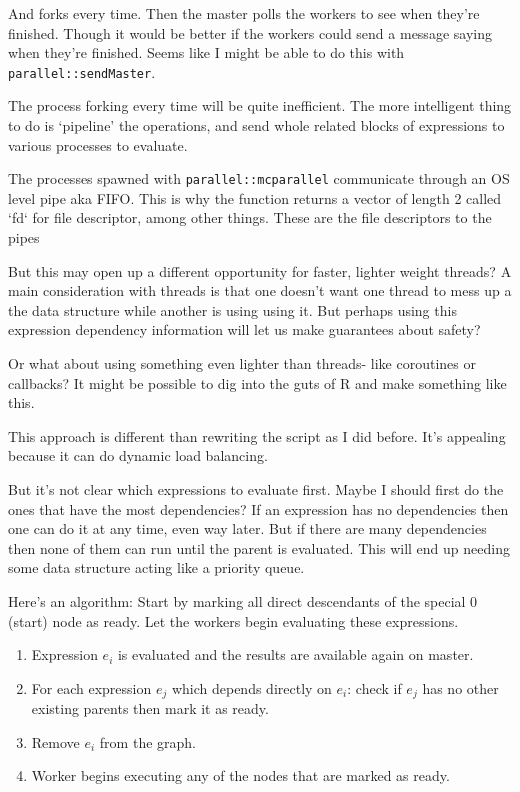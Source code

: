 \documentclass[12pt]{article}
\begin{document}
And forks every time. Then the master polls the workers to see
when they're finished. Though it would be better if the workers could send a
message saying when they're finished. Seems like I might be able to do this
with \texttt{parallel::sendMaster}.

The process forking every time will be quite inefficient. The more intelligent
thing to do is `pipeline' the operations, and send whole related blocks of
expressions to various processes to evaluate.

The processes spawned with \texttt{parallel::mcparallel} communicate
through an OS level pipe aka FIFO. This is why the function returns a vector of
length 2 called `fd` for file descriptor, among other things. These are the
file descriptors to the pipes

But this may open up a different opportunity for faster, lighter weight
threads? A main consideration with threads is that one doesn't want one
thread to mess up a the data structure while another is using using it. But
perhaps using this expression dependency information will let us make
guarantees about safety?

Or what about using something even lighter than threads- like coroutines or
callbacks? It might be possible to dig into the guts of R and make
something like this.

This approach is different than rewriting the script as I did before. It's appealing
because it can do dynamic load balancing.

But it's not clear which expressions to evaluate first. Maybe I should
first do the ones that have the most dependencies? If an expression has no
dependencies then one can do it at any time, even way later. But if there
are many dependencies then none of them can run until the parent is
evaluated. This will end up needing some data structure acting like a priority queue.

Here's an algorithm: Start by marking all direct descendants of the special
0 (start) node as ready. Let the workers begin evaluating these
expressions.

\begin{enumerate}
    \item Expression $e_i$ is evaluated and the results are available again
        on master.
    \item For each expression $e_j$ which depends directly on $e_i$: check
        if $e_j$ has no other existing parents then mark it as ready.
    \item Remove $e_i$ from the graph.
    \item Worker begins executing any of the nodes that are marked as ready.
\end{enumerate}
\end{document}
